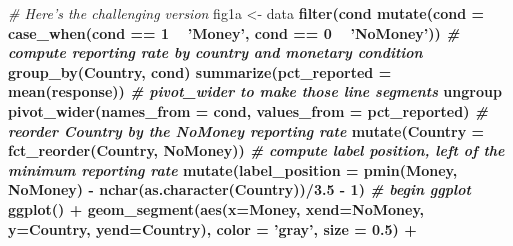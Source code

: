 \documentclass[12pt,halfline,a4paper,]{ouparticle}
\newenvironment{Shaded}{\begin{snugshade}}{\end{snugshade}}
\newcommand{\CommentTok}[1]{\textcolor[rgb]{0.56,0.35,0.01}{\textit{#1}}}
\newcommand{\DataTypeTok}[1]{\textcolor[rgb]{0.13,0.29,0.53}{#1}}
\newcommand{\DecValTok}[1]{\textcolor[rgb]{0.00,0.00,0.81}{#1}}
\newcommand{\FloatTok}[1]{\textcolor[rgb]{0.00,0.00,0.81}{#1}}
\newcommand{\KeywordTok}[1]{\textcolor[rgb]{0.13,0.29,0.53}{\textbf{#1}}}
\newcommand{\NormalTok}[1]{#1}
\newcommand{\OperatorTok}[1]{\textcolor[rgb]{0.81,0.36,0.00}{\textbf{#1}}}
\newcommand{\StringTok}[1]{\textcolor[rgb]{0.31,0.60,0.02}{#1}}
\begin{document}
\begin{Shaded}
\begin{Highlighting}[]
\CommentTok{# Here's the challenging version}
\NormalTok{fig1a <-}\StringTok{ }\NormalTok{data }\OperatorTok{%
\StringTok{  }\KeywordTok{filter}\NormalTok{(cond }\OperatorTok{%
\StringTok{  }\KeywordTok{mutate}\NormalTok{(}\DataTypeTok{cond =} \KeywordTok{case_when}\NormalTok{(cond }\OperatorTok{==}\StringTok{ }\DecValTok{1} \OperatorTok{~}\StringTok{ 'Money'}\NormalTok{, }
\NormalTok{                          cond }\OperatorTok{==}\StringTok{ }\DecValTok{0} \OperatorTok{~}\StringTok{ 'NoMoney'}\NormalTok{)) }\OperatorTok{%
\StringTok{  }\CommentTok{# compute reporting rate by country and monetary condition}
\StringTok{  }\KeywordTok{group_by}\NormalTok{(Country,}
\NormalTok{           cond) }\OperatorTok{%
\StringTok{  }\KeywordTok{summarize}\NormalTok{(}\DataTypeTok{pct_reported =} \KeywordTok{mean}\NormalTok{(response)) }\OperatorTok{%
\StringTok{  }\CommentTok{# pivot_wider to make those line segments}
\StringTok{  }\NormalTok{ungroup }\OperatorTok{%
\StringTok{  }\KeywordTok{pivot_wider}\NormalTok{(}\DataTypeTok{names_from =}\NormalTok{ cond, }\DataTypeTok{values_from =}\NormalTok{ pct_reported) }\OperatorTok{%
\StringTok{  }\CommentTok{# reorder Country by the NoMoney reporting rate }
\StringTok{  }\KeywordTok{mutate}\NormalTok{(}\DataTypeTok{Country =} \KeywordTok{fct_reorder}\NormalTok{(Country, NoMoney)) }\OperatorTok{%
\StringTok{  }\CommentTok{# compute label position, left of the minimum reporting rate}
\StringTok{  }\KeywordTok{mutate}\NormalTok{(}\DataTypeTok{label_position =} \KeywordTok{pmin}\NormalTok{(Money, NoMoney) }\OperatorTok{-}
\StringTok{           }\KeywordTok{nchar}\NormalTok{(}\KeywordTok{as.character}\NormalTok{(Country))}\OperatorTok{/}\FloatTok{3.5} \OperatorTok{-}\StringTok{ }\DecValTok{1}\NormalTok{) }\OperatorTok{%
\StringTok{  }\CommentTok{# begin ggplot}
\StringTok{  }\KeywordTok{ggplot}\NormalTok{() }\OperatorTok{+}
\StringTok{  }\KeywordTok{geom_segment}\NormalTok{(}\KeywordTok{aes}\NormalTok{(}\DataTypeTok{x=}\NormalTok{Money, }\DataTypeTok{xend=}\NormalTok{NoMoney, }\DataTypeTok{y=}\NormalTok{Country, }\DataTypeTok{yend=}\NormalTok{Country),}
               \DataTypeTok{color =} \StringTok{'gray'}\NormalTok{, }\DataTypeTok{size =} \FloatTok{0.5}\NormalTok{) }\OperatorTok{+}\StringTok{ }
}}}}}}}}}
\end{Highlighting}
\end{Shaded}
\end{document}
